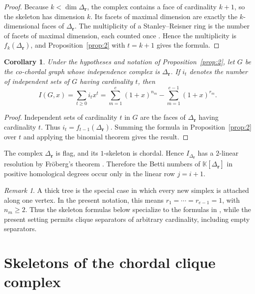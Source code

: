 \documentclass[11pt]{amsart}
\newtheorem{corollary}[theorem]{Corollary}
\theoremstyle{definition}
\theoremstyle{remark}
\newtheorem{remark}[theorem]{Remark}
\newcommand{\K}{\mathbb K}
\newcommand{\SR}[1]{\K[#1]}
\begin{document}
	\begin{proof}
		Because $k<\dim\Delta_{\mathbf r}$, the complex contains a face of cardinality $k+1$, so the skeleton has dimension $k$. Its facets of maximal dimension are exactly the $k$-dimensional faces of $\Delta_{\mathbf r}$. The multiplicity of a Stanley--Reisner ring is the number of facets of maximal dimension, each counted once \cite[Section~5.1]{BH98}. Hence the multiplicity is $f_k(\Delta_{\mathbf r})$, and Proposition~\ref{prop:2} with $t=k+1$ gives the formula.
	\end{proof}
	
	\begin{corollary}\label{cor:2}
		Under the hypotheses and notation of Proposition~\ref{prop:2}, let $G$ be the co-chordal graph whose independence complex is $\Delta_{\mathbf r}$. If $i_t$ denotes the number of independent sets of $G$ having cardinality $t$, then
		\[
		I(G,x)=\sum_{t\ge0}i_tx^t
		=
		\sum_{m=1}^e(1+x)^{n_m}
		-
		\sum_{m=1}^{e-1}(1+x)^{r_m}.
		\]
	\end{corollary}
	
	\begin{proof}
		Independent sets of cardinality $t$ in $G$ are the faces of $\Delta_{\mathbf r}$ having cardinality $t$. Thus $i_t=f_{t-1}(\Delta_{\mathbf r})$. Summing the formula in Proposition~\ref{prop:2} over $t$ and applying the binomial theorem gives the result.
	\end{proof}
	
	The complex $\Delta_{\mathbf r}$ is flag, and its $1$-skeleton is chordal. Hence $I_{\Delta_{\mathbf r}}$ has a $2$-linear resolution by Fr\"oberg's theorem \cite{Fr}. Therefore the Betti numbers of $\SR{\Delta_{\mathbf r}}$ in positive homological degrees occur only in the linear row $j=i+1$.
	
	\begin{remark}\label{rem:2}
		A thick tree is the special case in which every new simplex is attached along one vertex. In the present notation, this means $r_1=\cdots=r_{e-1}=1$, with $n_m\ge2$. Thus the skeleton formulas below specialize to the formulas in \cite{Fr2}, while the present setting permits clique separators of arbitrary cardinality, including empty separators.
	\end{remark}
	
	\section{Skeletons of the chordal clique complex}\label{sec:4}
	
\end{document}
